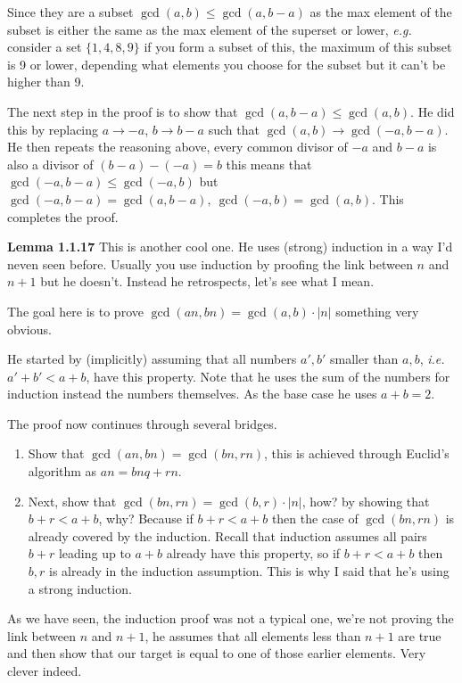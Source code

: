 \documentclass[aps,preprint,preprintnumbers,nofootinbib,showpacs,prd]{revtex4-1}
\newcommand{\ie}{{\it i.e.} }
\newcommand{\eg}{{\it e.g.} }
\begin{document}
Since they are a subset $\gcd(a,b) \le \gcd(a,b-a)$ as the max element of the subset is either the same as the max element of the superset or lower, \eg consider a set $\{1,4,8,9\}$ if you form a subset of this, the maximum of this subset is 9 or lower, depending what elements you choose for the subset but it can't be higher than 9.

The next step in the proof is to show that $\gcd(a,b-a) \le \gcd(a,b)$. He did this by replacing $a \to -a$, $b \to b-a$ such that $\gcd(a,b) \to \gcd(-a, b-a)$. He then repeats the reasoning above, every common divisor of $-a$ and $b-a$ is also a divisor of $(b-a) - (-a) = b$ this means that $\gcd(-a,b-a) \le \gcd(-a,b)$ but $\gcd(-a,b-a) = \gcd(a, b-a),~\gcd(-a,b) = \gcd(a,b)$. This completes the proof.

{\bf Lemma 1.1.17} This is another cool one. He uses (strong) induction in a way I'd neven seen before. Usually you use induction by proofing the link between $n$ and $n+1$ but he doesn't. Instead he retrospects, let's see what I mean.

The goal here is to prove $\gcd(an,bn) = \gcd(a,b) \cdot |n|$ something very obvious.

He started by (implicitly) assuming that all numbers $a',b'$ smaller than $a,b$, \ie $a'+b' < a+b$, have this property. Note that he uses the sum of the numbers for induction instead the numbers themselves. As the base case he uses $a + b = 2$.

The proof now continues through several bridges. 
\begin{enumerate}
\item Show that $\gcd(an,bn) = \gcd(bn,rn)$, this is achieved through Euclid's algorithm as $an = bnq + rn$.
\item Next, show that $\gcd(bn, rn) = \gcd(b,r) \cdot |n|$, how? by showing that $b + r < a + b$, why? Because if $b + r < a + b$ then the case of $\gcd(bn, rn)$ is already covered by the induction. Recall that induction assumes all pairs $b + r$ leading up to $a + b$ already have this property, so if $b + r < a + b$ then $b,r$ is already in the induction assumption. This is why I said that he's using a strong induction.
\end{enumerate}
As we have seen, the induction proof was not a typical one, we're not proving the link between $n$ and $n+1$, he assumes that all elements less than $n+1$ are true and then show that our target is equal to one of those earlier elements. Very clever indeed.
\end{document}
